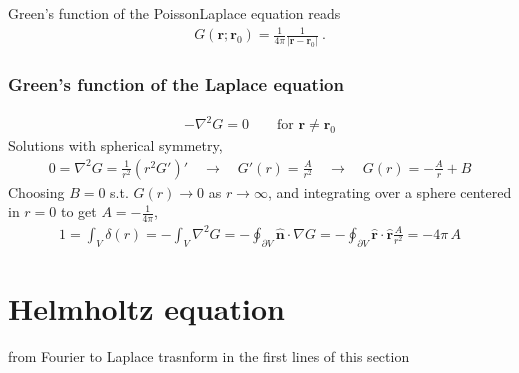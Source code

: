 \documentclass[letterpaper,10pt,english]{jupyterBook}
\begin{document}
\sphinxAtStartPar
Green’s function of the Poisson\sphinxhyphen{}Laplace equation reads
\begin{equation*}
\begin{split}G(\mathbf{r};\mathbf{r}_0) = \frac{1}{4 \pi} \frac{1}{\left| \mathbf{r}-\mathbf{r}_0 \right|} \ .\end{split}
\end{equation*}\subsubsection*{Green’s function of the Laplace equation}
\begin{equation*}
\begin{split}-\nabla^2 G = 0 \qquad \text{for $\mathbf{r} \ne \mathbf{r}_0$}\end{split}
\end{equation*}
\sphinxAtStartPar
Solutions with spherical symmetry,
\begin{equation*}
\begin{split}0 = \nabla^2 G = \frac{1}{r^2} \left( r^2 G' \right)'
\quad \rightarrow \quad
G'(r) = \frac{A}{r^2} \quad \rightarrow \quad G(r) = - \frac{A}{r} + B
\end{split}
\end{equation*}
\sphinxAtStartPar
Choosing \(B = 0\) s.t. \(G(r) \rightarrow 0\) as \(r \rightarrow \infty\), and integrating over a sphere centered in \(r=0\) to get \(A = -\frac{1}{4 \pi}\),
\begin{equation*}
\begin{split}1 = \int_{V} \delta(r) = - \int_{V} \nabla^2 G = - \oint_{\partial V} \hat{\mathbf{n}} \cdot \nabla G
= -\oint_{\partial V} \hat{\mathbf{r}} \cdot \hat{\mathbf{r}} \frac{A}{r^2} = - 4 \pi \, A \end{split}
\end{equation*}

\section{Helmholtz equation}
\label{\detokenize{ch/green-function:helmholtz-equation}}
\sphinxAtStartPar
{} from Fourier to Laplace trasnform in the first lines of this section
\end{document}
